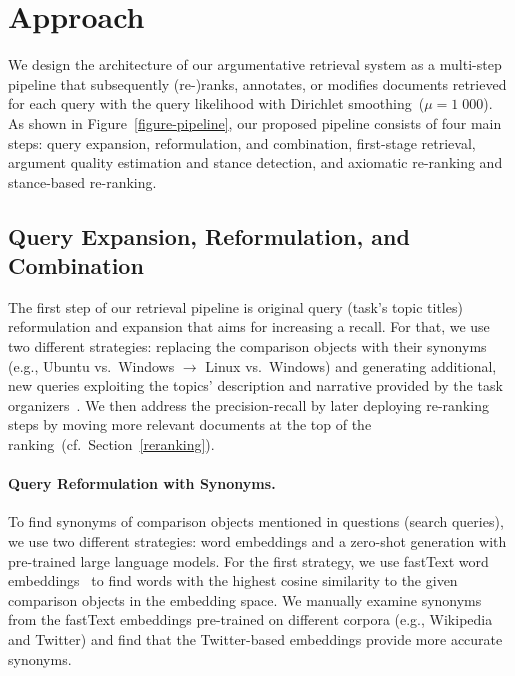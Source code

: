 \section{Approach}\label{approach}



We design the architecture of our argumentative retrieval system as a multi-step pipeline that subsequently (re-)ranks, annotates, or modifies documents retrieved for each query with the query likelihood with Dirichlet smoothing~(\(\mu = 1\;000\)). As shown in Figure~\ref{figure-pipeline}, our proposed pipeline consists of four main steps:
\Ni query expansion, reformulation, and combination,
\Nii first-stage retrieval,
\Niii argument quality estimation and stance detection,
and \Niv axiomatic re-ranking and stance-based re-ranking.

\subsection{Query Expansion, Reformulation, and Combination}
\label{reformulation}

The first step of our retrieval pipeline is original query (task's topic titles) reformulation and expansion that aims for increasing a recall.
For that, we use two different strategies: \Ni replacing the comparison objects with their synonyms (e.g., Ubuntu vs.\ Windows $\rightarrow$ Linux vs.\ Windows) and \Nii generating additional, new queries exploiting the topics' description and narrative provided by the task organizers~\cite{BondarenkoFKSGBPBSWPH2022}.
We then address the precision-recall by later deploying re-ranking steps by moving more relevant documents at the top of the ranking~(cf.\ Section~\ref{reranking}).

\paragraph{Query Reformulation with Synonyms.}

To find synonyms of comparison objects mentioned in questions (search queries), we use two different strategies: \Ni word embeddings and \Nii a zero-shot generation with pre-trained large language models.
For the first strategy, we use fastText word embeddings~\cite{BojanowskiGJM2017}  to find words with the highest cosine similarity to the given comparison objects in the embedding space.
We manually examine  synonyms from the fastText embeddings pre-trained on different corpora (e.g., Wikipedia and Twitter) and find that the Twitter-based embeddings provide more accurate synonyms.

